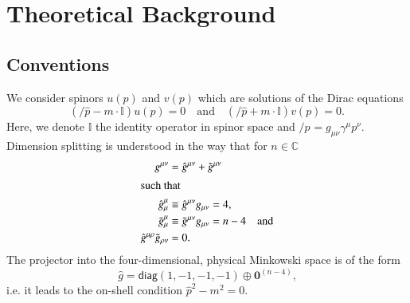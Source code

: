 \documentclass[preprint,number,12pt,sort&compress]{elsarticle}
\newcommand{\fmslash}[1]{\ensuremath{/\!\!\!{#1}}}
\newcommand{\pslash}[1][{}]{\fmslash{p}_{#1}}
\newcommand{\One}{{\mathbb{I}}}
\newcommand{\Cset}{\mathbb{C}}
\begin{document}
\section{Theoretical Background}\label{sec:theory}

\subsection{Conventions}
We consider spinors $u(p)$ and $v(p)$
which are solutions of the Dirac equations
\begin{equation}
(\fmslash{\hat{p}} - m\cdot\One)u(p)=0\quad\text{and}\quad
(\fmslash{\hat{p}} + m\cdot\One)v(p)=0\text{.}
\end{equation}
Here, we denote $\One$ the identity operator in spinor space and
$\pslash=g_{\mu\nu}\gamma^\mu p^\nu$. Dimension splitting is
understood in the way that for $n\in\Cset$
\begin{subequations}\label{eq:dimension-splitting}
\begin{align}
   g^{\mu\nu}&=\hat{g}^{\mu\nu}+\tilde{g}^{\mu\nu}\\
\intertext{such that}
   \hat{g}^\mu_\mu&\equiv \hat{g}^{\mu\nu}g_{\mu\nu}=4,\\
   \tilde{g}^\mu_\mu&\equiv \tilde{g}^{\mu\nu}g_{\mu\nu}=n-4%
	\quad\text{and}\\
   \hat{g}^{\mu\rho}\tilde{g}_{\rho\nu}&=0\text{.}
\end{align}
\end{subequations}
The projector into the four-dimensional, physical Minkowski space
is of the form
\begin{equation}
\hat{g}=\mathsf{diag}(1,-1,-1,-1)\oplus\mathbf{0}^{(n-4)}\text{,}
\end{equation}
i.e. it leads to the on-shell condition $\hat{p}^2-m^2=0$.
\end{document}
